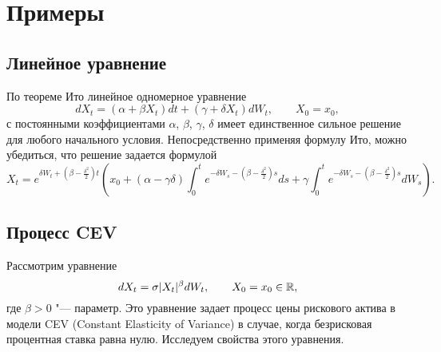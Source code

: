 \section{Примеры}
\subsection{Линейное уравнение}

По теореме Ито линейное одномерное уравнение 
\[
dX_t = (\alpha + \beta X_t)dt + (\gamma + \delta X_t) d W_t, \qquad X_0=x_0,
\]
с постоянными коэффициентами %
$\alpha$, $\beta$, $\gamma$, $\delta$ имеет единственное сильное решение для любого начального условия.
Непосредственно применяя формулу Ито, можно убедиться, что решение задается формулой
\[
X_t = e^{\delta W_t + (\beta-\frac{\delta^2}{2})t}
\left(x_0 + (\alpha - \gamma\delta) \int_0^t e^{-\delta W_s - (\beta-\frac{\delta^2}{2})s} ds
+ \gamma \int_0^t e^{-\delta W_s - (\beta-\frac{\delta^2}{2})s} dW_s\right).
\]


\subsection{Процесс CEV}

Рассмотрим уравнение
\begin{equation}
\label{sde:cev}
d X_t = \sigma |X_t|^\beta d W_t, \qquad X_0=x_0\in \mathbb{R},
\end{equation}
где $\beta>0$ "--- параметр.
Это уравнение задает процесс цены рискового актива в модели CEV (Constant Elasticity of Variance) в случае, когда безрисковая процентная ставка равна нулю.
Исследуем свойства этого уравнения.

